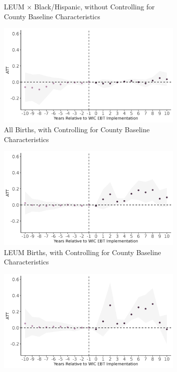 \begin{figure}[!htbp]
\begin{subfigure}[t]{.325\textwidth}
		\caption{LEUM $\times$ Black/Hispanic, without Controlling for County Baseline Characteristics}
		\label{cs_es3}
	\end{subfigure}
	\begin{subfigure}[t]{.325\textwidth}
		\centering
		\includegraphics[width=\textwidth]{wic_br_dyn_all.png}  
		\caption{All Births, with Controlling for County Baseline Characteristics}
		\label{cs_es1}
	\end{subfigure}
	\begin{subfigure}[t]{.325\textwidth}
		\centering
		\includegraphics[width=\textwidth]{wic_br_dyn_leum.png}  
		\caption{LEUM Births, with Controlling for County Baseline Characteristics}
		\label{cs_es2}
	\end{subfigure}
	\begin{subfigure}[t]{.325\textwidth}
		\centering
		\includegraphics[width=\textwidth]{wic_br_dyn_leum_minor.png}  

\end{subfigure}
\end{figure}
